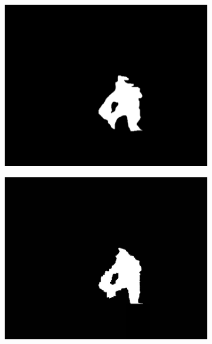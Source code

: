 \documentclass[14pt, a4paper]{extreport}
\begin{document}
	\begin{figure}[h!]
		\begin{subfigure}{.32\textwidth}
			\centering
			\includegraphics[width = \textwidth]{image/chapter_3/examples/mask_razmet/206}
		\end{subfigure}
		\begin{subfigure}{.32\textwidth}
			\centering
			\includegraphics[width = \textwidth]{image/chapter_3/examples/mask/206}
		\end{subfigure}
		\begin{subfigure}{.32\textwidth}
			\centering

\end{subfigure}
\end{figure}
\end{document}
